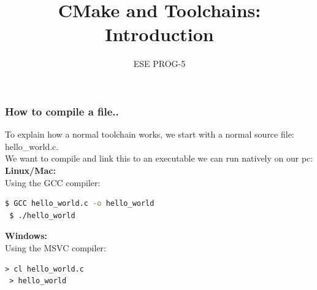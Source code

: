 \documentclass{beamer}
\title{CMake and Toolchains: Introduction}
\subtitle{ESE PROG-5}
\begin{document}
\begin{frame}


\titlepage
\end{frame}

\begin{frame}[fragile]
\frametitle{How to compile a file..}
To explain how a normal toolchain works, we start with a normal source file:
hello\_world.c. \\ \bigskip
We want to compile and link this to an executable we can run natively on our pc: \\
\textbf{Linux/Mac:} \\
Using the GCC compiler:
\begin{lstlisting}[language=bash]
 $ GCC hello_world.c -o hello_world
 $ ./hello_world
\end{lstlisting} 

\textbf{Windows:} \\
Using the MSVC compiler:
\begin{lstlisting}[language=VBScript]
 > cl hello_world.c
 > hello_world 
\end{lstlisting}
\end{frame}
\end{document}
